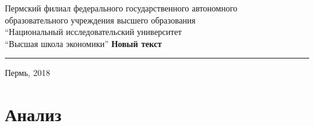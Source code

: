 \documentclass[oneside,final,12pt]{extreport}
\begin{document}
\begin{titlepage}
\begin{centering}

Пермский филиал федерального государственного автономного\\
образовательного учреждения высшего образования\\
“Национальный исследовательский университет\\
“Высшая школа экономики”
\vskip2cm
\bf Новый текст\\
\rule{15cm}{1mm}
\vfill
Пермь, 2018

\end{centering}
\end{titlepage}
\setcounter{page}{2}

\tableofcontents
\chapter{Анализ}
\end{document}

